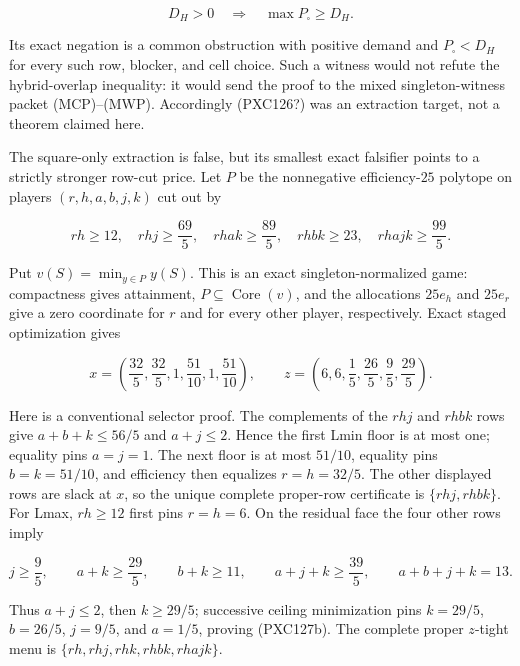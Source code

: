 \documentclass[11pt]{article}
\begin{document}
\begin{equation}
 D_H>0\quad\Longrightarrow\quad
 \max P_{\square}\ge D_H.                            \tag{PXC126?}
\end{equation}

Its exact negation is a common obstruction with positive demand and
$P_{\square}<D_H$ for every such row, blocker, and cell choice.  Such a
witness would not refute the hybrid-overlap inequality: it would send the
proof to the mixed singleton-witness packet (MCP)--(MWP).  Accordingly
(PXC126?) was an extraction target, not a theorem claimed here.

The square-only extraction is false, but its smallest exact falsifier points
to a strictly stronger row-cut price.  Let $P$ be the nonnegative
efficiency-$25$ polytope on players $(r,h,a,b,j,k)$ cut out by

\begin{equation}
 rh\ge12,\quad rhj\ge\frac{69}{5},\quad
 rhak\ge\frac{89}{5},\quad rhbk\ge23,\quad
 rhajk\ge\frac{99}{5}.                              \tag{PXC127a}
\end{equation}

Put $v(S)=\min_{y\in P}y(S)$.  This is an exact singleton-normalized
game: compactness gives attainment, $P\subseteq\operatorname{Core}(v)$,
and the allocations $25e_h$ and $25e_r$ give a zero coordinate for
$r$ and for every other player, respectively.  Exact staged optimization
gives

\begin{equation}
 x=\left(\frac{32}{5},\frac{32}{5},1,\frac{51}{10},1,
          \frac{51}{10}\right),\qquad
 z=\left(6,6,\frac15,\frac{26}{5},\frac95,\frac{29}{5}\right).
                                                               \tag{PXC127b}
\end{equation}

Here is a conventional selector proof.  The complements of the $rhj$ and
$rhbk$ rows give $a+b+k\le56/5$ and $a+j\le2$.  Hence the first Lmin
floor is at most one; equality pins $a=j=1$.  The next floor is at most
$51/10$, equality pins $b=k=51/10$, and efficiency then equalizes
$r=h=32/5$.  The other displayed rows are slack at $x$, so the unique
complete proper-row certificate is $\{rhj,rhbk\}$.  For Lmax, $rh\ge12$
first pins $r=h=6$.  On the residual face the four other rows imply

\[
 j\ge\frac95,\qquad a+k\ge\frac{29}{5},\qquad
 b+k\ge11,\qquad a+j+k\ge\frac{39}{5},
 \qquad a+b+j+k=13.
\]

Thus $a+j\le2$, then $k\ge29/5$; successive ceiling minimization pins
$k=29/5$, $b=26/5$, $j=9/5$, and $a=1/5$, proving (PXC127b).
The complete proper $z$-tight menu is
$\{rh,rhj,rhk,rhbk,rhajk\}$.
\end{document}
